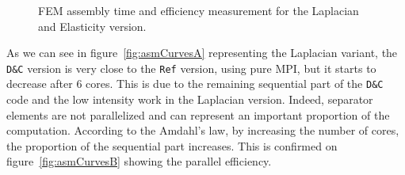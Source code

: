 \documentclass[10pt]{IOS-Book-Article}
\begin{document}
\begin{figure}[htp]
 \caption{FEM assembly time and efficiency measurement for the Laplacian and Elasticity version. }
 \label{fig:asmCurves}
\end{figure}

As we can see in figure~\ref{fig:asmCurvesA} representing the Laplacian variant, the {\tt D\&C} version is very close to the {\tt Ref} version, using pure MPI, but it starts to decrease after 6 cores.
This is due to the remaining sequential part of the {\tt D\&C} code and the low intensity work in the Laplacian version.
Indeed, separator elements are not parallelized and can represent an important proportion of the computation.
According to the Amdahl's law, by increasing the number of cores, the proportion of the sequential part increases.
This is confirmed on figure~\ref{fig:asmCurvesB} showing the parallel efficiency.
\end{document}
